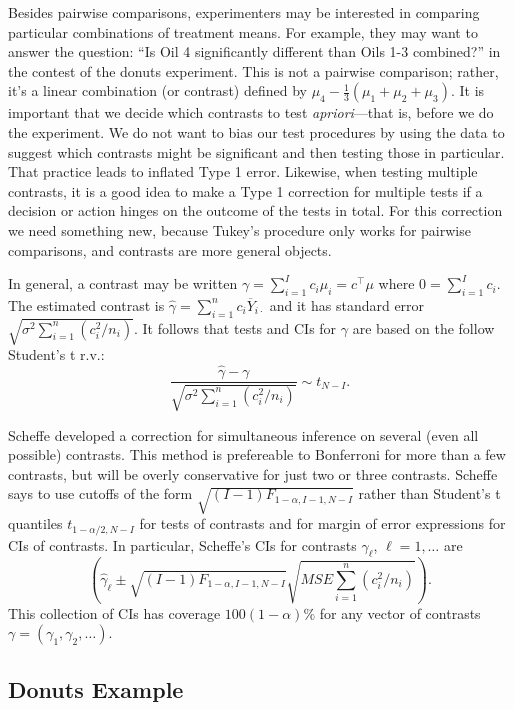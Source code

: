 \documentclass[
]{book}
\begin{document}
Besides pairwise comparisons, experimenters may be interested in comparing particular combinations of treatment means. For example, they may want to answer the question: ``Is Oil 4 significantly different than Oils 1-3 combined?'' in the contest of the donuts experiment. This is not a pairwise comparison; rather, it's a linear combination (or contrast) defined by \(\mu_4 - \tfrac13(\mu_1+\mu_2+\mu_3)\). It is important that we decide which contrasts to test \emph{apriori}---that is, before we do the experiment. We do not want to bias our test procedures by using the data to suggest which contrasts might be significant and then testing those in particular. That practice leads to inflated Type 1 error. Likewise, when testing multiple contrasts, it is a good idea to make a Type 1 correction for multiple tests if a decision or action hinges on the outcome of the tests in total. For this correction we need something new, because Tukey's procedure only works for pairwise comparisons, and contrasts are more general objects.

In general, a contrast may be written \(\gamma = \sum_{i=1}^I c_i\mu_i = c^\top \mu\) where \(0=\sum_{i=1}^I c_i\). The estimated contrast is \(\hat\gamma = \sum_{i=1}^n c_i\overline Y_{i\cdot}\) and it has standard error \(\sqrt{\sigma^2\sum_{i=1}^n (c_i^2/n_i)}\). It follows that tests and CIs for \(\gamma\) are based on the follow Student's t r.v.:
\[\frac{\hat\gamma - \gamma}{\sqrt{\sigma^2\sum_{i=1}^n (c_i^2/n_i)}}\sim t_{N-I}.\]

Scheff\textquotesingle e developed a correction for simultaneous inference on several (even all possible) contrasts. This method is prefereable to Bonferroni for more than a few contrasts, but will be overly conservative for just two or three contrasts. Scheff\textquotesingle e says to use cutoffs of the form \(\sqrt{(I-1)F_{1-\alpha, I-1, N-I}}\) rather than Student's t quantiles \(t_{1-\alpha/2, N-I}\) for tests of contrasts and for margin of error expressions for CIs of contrasts. In particular, Scheff\textquotesingle e's CIs for contrasts \(\gamma_\ell\), \(\ell=1,\ldots\) are
\[\left(\hat\gamma_\ell \pm \sqrt{(I-1)F_{1-\alpha, I-1, N-I}}\sqrt{MSE\sum_{i=1}^n (c_i^2/n_i)}\right).\]
This collection of CIs has coverage \(100(1-\alpha)\%\) for any vector of contrasts \(\gamma = (\gamma_1, \gamma_2, \ldots )\).

\hypertarget{donuts-example-1}{%
\subsection{Donuts Example}\label{donuts-example-1}}
\end{document}
